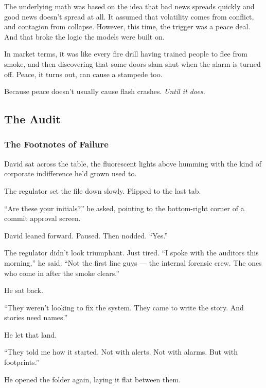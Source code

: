 \medskip


The underlying math was based on the idea 
that bad news spreads quickly and good news doesn’t spread at all. It assumed that volatility comes from conflict, 
and contagion from collapse. However, this time, the trigger was a peace deal. And that 
broke the logic the models were built on.

In market terms, it was like every fire drill having trained people to flee from smoke, and then discovering 
that some doors slam shut when the alarm is turned off.  Peace, it turns out, can cause a stampede too.

Because peace doesn’t usually cause flash crashes. \textit{Until it does.}












\subsection{The Audit}

\subsubsection{The Footnotes of Failure}

David sat across the table, the fluorescent lights above humming with the kind of corporate indifference he’d grown used to.

The regulator set the file down slowly. Flipped to the last tab.

“Are these your initials?” he asked, pointing to the bottom-right corner of a commit approval screen.

David leaned forward. Paused. Then nodded.
“Yes.”

The regulator didn’t look triumphant. Just tired.
“I spoke with the auditors this morning,” he said. “Not the first line guys — the internal forensic crew. The ones who come in after the smoke clears.”

He sat back.

“They weren’t looking to fix the system. They came to write the story. And stories need names.”

He let that land.

“They told me how it started. Not with alerts. Not with alarms. But with footprints.”

He opened the folder again, laying it flat between them.


